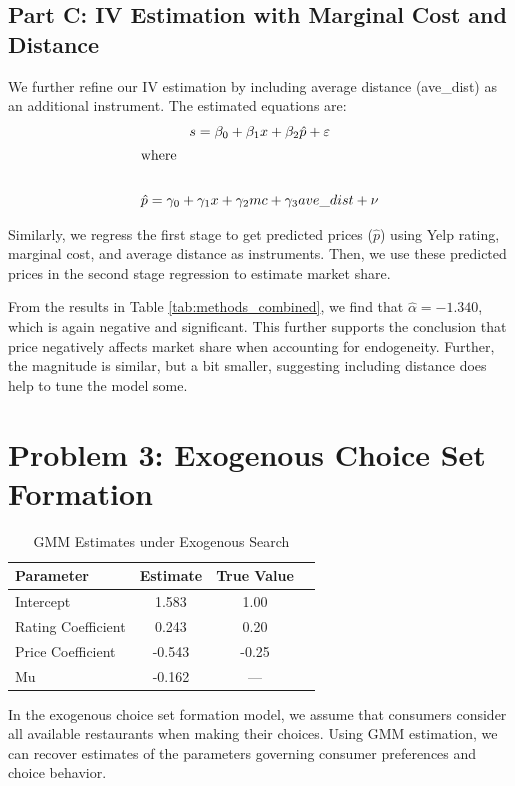 \documentclass{article}
\begin{document}
\subsection*{Part C: IV Estimation with Marginal Cost and Distance}

We further refine our IV estimation by including average distance (ave\_dist) as an additional instrument.
The estimated equations are:
\begin{gather*}
  s = \beta_0 + \beta_1 x + \beta_2 \hat{p} + \varepsilon \\
  \shortintertext{where} \\
  \hat{p} = \gamma_0 + \gamma_1 x + \gamma_2 mc + \gamma_3 ave\_dist + \nu
\end{gather*}

Similarly, we regress the first stage to get predicted prices ($\hat{p}$) using Yelp rating, marginal cost, and average distance as instruments.
Then, we use these predicted prices in the second stage regression to estimate market share.

From the results in Table \ref{tab:methods_combined}, we find that $\hat{\alpha} = -1.340$, which is again negative and significant.
This further supports the conclusion that price negatively affects market share when accounting for endogeneity. Further,
the magnitude is similar, but a bit smaller, suggesting including distance does help to tune the model some.

\section*{Problem 3: Exogenous Choice Set Formation}

\begin{table}[htbp]
\centering
\caption{GMM Estimates under Exogenous Search}
\label{tab:q3_exogenous}
\begin{tabular}{lccc}
\hline\hline
\textbf{Parameter} & \textbf{Estimate} & \textbf{True Value} \\
\hline
Intercept              & 1.583 & 1.00 \\
Rating Coefficient     & 0.243 & 0.20 \\
Price Coefficient      & -0.543 & -0.25 \\
Mu                     & -0.162 & --- \\
\hline\hline
\end{tabular}
\end{table}

In the exogenous choice set formation model, we assume that consumers consider all available restaurants when making their choices.
Using GMM estimation, we can recover estimates of the parameters governing consumer preferences and choice behavior.
\end{document}
